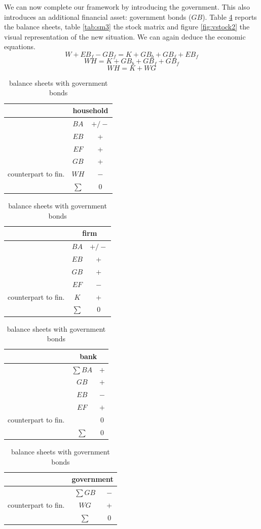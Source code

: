 \documentclass{article}
\begin{document}
We can now complete our framework by introducing the government. This also introduces an additional financial asset: government bonds ($GB$). 
Table \ref{tab:bsall} reports the balance sheets, table \ref{tab:sm3} the stock matrix and figure \ref{fig:vstock2} the visual representation of the new situation. 
We can again deduce the economic equations.
\[W+EB_{f}-GB_{f}=K+GB_b+GB_f+EB_{f}\]
\[WH=K+GB_b+GB_f+GB_{f}\]
\[WH=K+WG\]


\begin{table}[p]
	\begin{center}

	\begin{tabular}{r c c }
	
		&\multicolumn{2}{c}{household}\\
\hline
&$BA$	&	$+/-$  \\
&$EB$	&	+  \\
&$EF$	&	+  \\
&$GB$	&	+  \\
\hline
counterpart to fin. &$WH$	&$-$\\
\hline
&$\sum$	&	0
\end{tabular}
\hskip5mm
\begin{tabular}{r c c}
	& \multicolumn{2}{c}{firm} \\
\hline
&$BA$	&	$+/-$  \\
&$EB$	&	+  \\
&$GB$	&$+$	\\
&$EF$	&$-$	\\
\hline
counterpart to fin.	&$K$	& +	\\
\hline
&$\sum$		&0\\
\end{tabular}
\hskip5mm
\begin{tabular}{r c c}
	& \multicolumn{2}{c}{bank} \\
\hline
&$\sum BA$	&	$+$  \\
&$GB$	&	$+$  \\
&$EB$	&	$-$  \\
&$EF$	&$+$	\\
\hline
counterpart to fin.	&	& 0	\\
\hline
&$\sum$		&0\\
\end{tabular}
\hskip5mm
\begin{tabular}{r c c}
	& \multicolumn{2}{c}{government} \\
\hline
&$\sum GB$	&	$-$  \\
\hline
counterpart to fin.	&$WG$	& +	\\
\hline
&$\sum$		&0\\
\end{tabular}


\end{center}
	\caption{balance sheets with government bonds}
	\label{tab:bsall}
\end{table}
\end{document}
